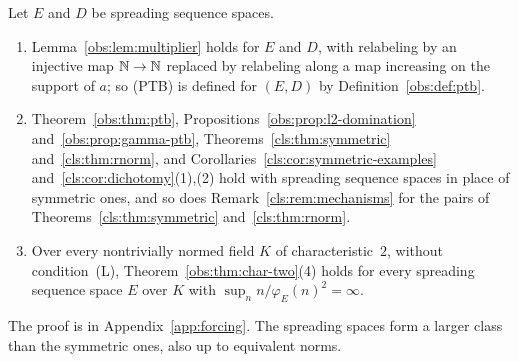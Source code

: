 \begin{theorem}\label{cls:thm:spreading}
Let $E$ and $D$ be spreading sequence spaces.
\begin{enumerate}
\item Lemma~\ref{obs:lem:multiplier} holds for $E$ and $D$, with relabeling by an injective map $\mathbb N\to\mathbb N$ replaced by
relabeling along a map increasing on the support of $a$; so \textup{(PTB)} is defined for $(E,D)$ by
Definition~\ref{obs:def:ptb}.
\item Theorem~\ref{obs:thm:ptb}, Propositions~\ref{obs:prop:l2-domination} and~\ref{obs:prop:gamma-ptb},
Theorems~\ref{cls:thm:symmetric} and~\ref{cls:thm:rnorm}, and Corollaries~\ref{cls:cor:symmetric-examples}
and~\ref{cls:cor:dichotomy}(1),(2) hold with spreading sequence spaces in place of symmetric ones, and so does
Remark~\ref{cls:rem:mechanisms} for the pairs of Theorems~\ref{cls:thm:symmetric} and~\ref{cls:thm:rnorm}.
\item Over every nontrivially normed field $K$ of characteristic~$2$, without condition~\textup{(L)},
Theorem~\ref{obs:thm:char-two}(4) holds for every spreading sequence space $E$ over $K$ with
$\sup_nn/\varphi_E(n)^2=\infty$.
\end{enumerate}
\end{theorem}

The proof is in Appendix~\ref{app:forcing}. The spreading spaces form a larger class than the symmetric ones, also up
to equivalent norms.

